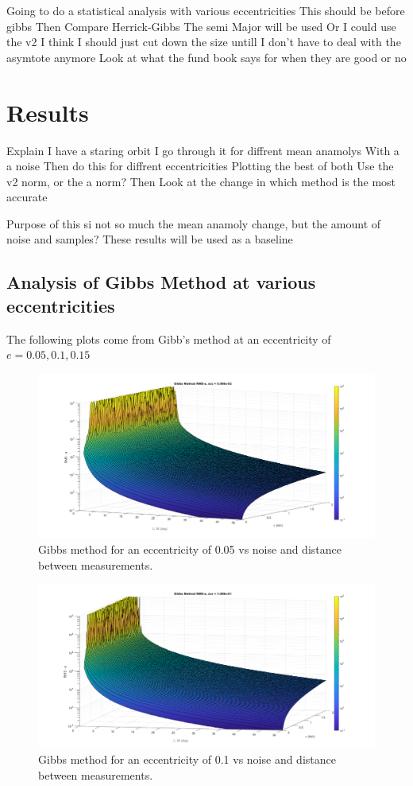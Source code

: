 \documentclass[12pt]{article}
\begin{document}
	
	Going to do a statistical analysis with various eccentricities
	This should be before gibbs
	Then Compare Herrick-Gibbs
	The semi Major will be used
	Or I could use the v2
	I think I should just cut down the size untill I don't have to deal with the asymtote anymore
	Look at what the fund book says for when they are good or no
	
	\section{Results}
	Explain I have a staring orbit
	I go through it for diffrent mean anamolys
	With a a noise
	Then do this for diffrent eccentricities
	Plotting the best of both
	Use the v2 norm, or the a norm?
	Then Look at the change in which method is the most accurate
	
	Purpose of this si not so much the mean anamoly change, but the amount of noise and samples?
	\fi
	These results will be used as a baseline
	
	\subsection{Analysis of Gibbs Method at various eccentricities}
	The following plots come from Gibb's method at an eccentricity of $e=0.05,0.1,0.15$
	\begin{figure}
		\centering
		\includegraphics[width=0.7\linewidth]{gibbs_e_05}
		\caption{Gibbs method for an eccentricity of 0.05 vs noise and distance between measurements.}
		\label{fig:gibbse05}
	\end{figure}

	\begin{figure}
	\centering
	\includegraphics[width=0.7\linewidth]{gibbs_e_1}
	\caption{Gibbs method for an eccentricity of 0.1 vs noise and distance between measurements.}
	\label{fig:gibbse1}
\end{figure}
\end{document}

